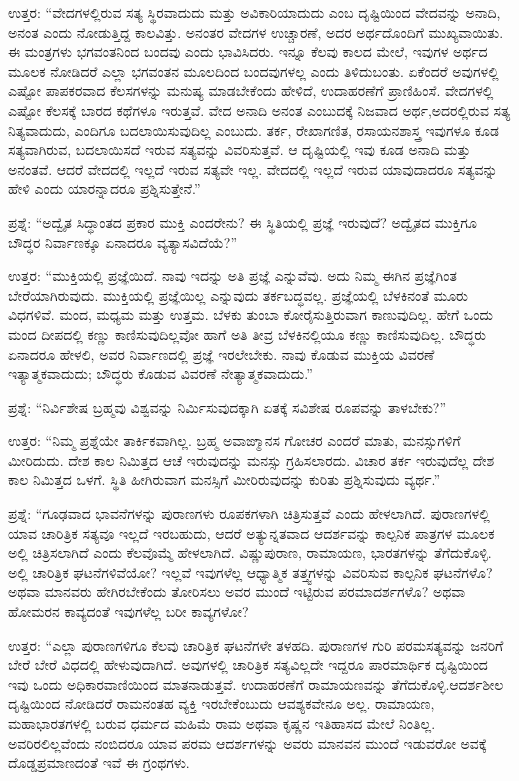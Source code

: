 ಉತ್ತರ: “ವೇದಗಳಲ್ಲಿರುವ ಸತ್ಯ ಸ್ಥಿರವಾದುದು ಮತ್ತು ಅವಿಕಾರಿಯಾದುದು ಎಂಬ ದೃಷ್ಟಿಯಿಂದ ವೇದವನ್ನು ಅನಾದಿ, ಅನಂತ ಎಂದು ನೋಡುತ್ತಿದ್ದ ಕಾಲವಿತ್ತು. ಅನಂತರ ವೇದಗಳ ಉಚ್ಚಾರಣೆ, ಅದರ ಅರ್ಥದೊಂದಿಗೆ ಮುಖ್ಯವಾಯಿತು. ಈ ಮಂತ್ರಗಳು ಭಗವಂತನಿಂದ ಬಂದವು ಎಂದು ಭಾವಿಸಿದರು. ಇನ್ನೂ ಕೆಲವು ಕಾಲದ ಮೇಲೆ, ಇವುಗಳ ಅರ್ಥದ ಮೂಲಕ ನೋಡಿದರೆ ಎಲ್ಲಾ ಭಗವಂತನ ಮೂಲದಿಂದ ಬಂದವುಗಳಲ್ಲ ಎಂದು ತಿಳಿದುಬಂತು. ಏಕೆಂದರೆ ಅವುಗಳಲ್ಲಿ ಎಷ್ಟೋ ಪಾಪಕರವಾದ ಕೆಲಸಗಳನ್ನು ಮನುಷ್ಯ ಮಾಡಬೇಕೆಂದು ಹೇಳಿದೆ, ಉದಾಹರಣೆಗೆ ಪ್ರಾಣಿಹಿಂಸೆ. ವೇದಗಳಲ್ಲಿ ಎಷ್ಟೋ ಕೆಲಸಕ್ಕೆ ಬಾರದ ಕಥೆಗಳೂ ಇರುತ್ತವೆ. ವೇದ ಅನಾದಿ ಅನಂತ ಎಂಬುದಕ್ಕೆ ನಿಜವಾದ ಅರ್ಥ,\break ಅದರಲ್ಲಿರುವ ಸತ್ಯ ನಿತ್ಯವಾದುದು, ಎಂದಿಗೂ ಬದಲಾಯಿಸುವುದಿಲ್ಲ ಎಂಬುದು. ತರ್ಕ, ರೇಖಾಗಣಿತ, ರಸಾಯನಶಾಸ್ತ್ರ ಇವುಗಳೂ ಕೂಡ ಸತ್ಯವಾಗಿರುವ, ಬದಲಾಯಿಸದೆ ಇರುವ ಸತ್ಯವನ್ನು ವಿವರಿಸುತ್ತವೆ. ಆ ದೃಷ್ಟಿಯಲ್ಲಿ ಇವು ಕೂಡ ಅನಾದಿ ಮತ್ತು ಅನಂತವೆ. ಆದರೆ ವೇದದಲ್ಲಿ ಇಲ್ಲದೆ ಇರುವ ಸತ್ಯವೇ ಇಲ್ಲ. ವೇದದಲ್ಲಿ ಇಲ್ಲದೆ ಇರುವ ಯಾವುದಾದರೂ ಸತ್ಯವನ್ನು ಹೇಳಿ ಎಂದು ಯಾರನ್ನಾದರೂ ಪ್ರಶ್ನಿಸುತ್ತೇನೆ.”

ಪ್ರಶ್ನೆ: “ಅದ್ವೈತ ಸಿದ್ಧಾಂತದ ಪ್ರಕಾರ ಮುಕ್ತಿ ಎಂದರೇನು? ಈ ಸ್ಥಿತಿಯಲ್ಲಿ ಪ್ರಜ್ಞೆ ಇರುವುದೆ? ಅದ್ವೈತದ ಮುಕ್ತಿಗೂ ಬೌದ್ಧರ ನಿರ್ವಾಣಕ್ಕೂ ಏನಾದರೂ ವ್ಯತ್ಯಾಸವಿದೆಯೆ?”

ಉತ್ತರ: “ಮುಕ್ತಿಯಲ್ಲಿ ಪ್ರಜ್ಞೆಯಿದೆ. ನಾವು ಇದನ್ನು ಅತಿ ಪ್ರಜ್ಞೆ ಎನ್ನುವೆವು. ಅದು ನಿಮ್ಮ ಈಗಿನ ಪ್ರಜ್ಞೆಗಿಂತ ಬೇರೆಯಾಗಿರುವುದು. ಮುಕ್ತಿಯಲ್ಲಿ ಪ್ರಜ್ಞೆಯಿಲ್ಲ ಎನ್ನುವುದು ತರ್ಕಬದ್ಧವಲ್ಲ. ಪ್ರಜ್ಞೆಯಲ್ಲಿ ಬೆಳಕಿನಂತೆ ಮೂರು ವಿಧಗಳಿವೆ. ಮಂದ, ಮಧ್ಯಮ ಮತ್ತು ಉತ್ತಮ. ಬೆಳಕು ತುಂಬಾ ಕೋರೈಸುತ್ತಿರುವಾಗ ಕಾಣುವುದಿಲ್ಲ. ಹೇಗೆ ಒಂದು ಮಂದ ದೀಪದಲ್ಲಿ ಕಣ್ಣು ಕಾಣಿಸುವುದಿಲ್ಲವೋ ಹಾಗೆ ಅತಿ ತೀವ್ರ ಬೆಳಕಿನಲ್ಲಿಯೂ ಕಣ್ಣು ಕಾಣಿಸುವುದಿಲ್ಲ. ಬೌದ್ಧರು ಏನಾದರೂ ಹೇಳಲಿ, ಅವರ ನಿರ್ವಾಣದಲ್ಲಿ ಪ್ರಜ್ಞೆ ಇರಲೇಬೇಕು. ನಾವು ಕೊಡುವ ಮುಕ್ತಿಯ ವಿವರಣೆ ಇತ್ಯಾತ್ಮಕವಾದುದು; ಬೌದ್ಧರು ಕೊಡುವ ವಿವರಣೆ ನೇತ್ಯಾತ್ಮಕವಾದುದು.”

ಪ್ರಶ್ನೆ: “ನಿರ್ವಿಶೇಷ ಬ್ರಹ್ಮವು ವಿಶ್ವವನ್ನು ನಿರ್ಮಿಸುವುದಕ್ಕಾಗಿ ಏತಕ್ಕೆ ಸವಿಶೇಷ ರೂಪವನ್ನು ತಾಳಬೇಕು?”

ಉತ್ತರ: “ನಿಮ್ಮ ಪ್ರಶ್ನೆಯೇ ತಾರ್ಕಿಕವಾಗಿಲ್ಲ. ಬ್ರಹ್ಮ ಅವಾಙ್ಮಾನಸ ಗೋಚರ ಎಂದರೆ ಮಾತು, ಮನಸ್ಸುಗಳಿಗೆ ಮೀರಿದುದು. ದೇಶ ಕಾಲ ನಿಮಿತ್ತದ ಆಚೆ ಇರುವುದನ್ನು ಮನಸ್ಸು ಗ್ರಹಿಸಲಾರದು. ವಿಚಾರ ತರ್ಕ ಇರುವುದೆಲ್ಲ ದೇಶ ಕಾಲ ನಿಮಿತ್ತದ ಒಳಗೆ. ಸ್ಥಿತಿ ಹೀಗಿರುವಾಗ ಮನಸ್ಸಿಗೆ ಮೀರಿರುವುದನ್ನು ಕುರಿತು ಪ್ರಶ್ನಿಸುವುದು ವ್ಯರ್ಥ.”

ಪ್ರಶ್ನೆ: “ಗೂಢವಾದ ಭಾವನೆಗಳನ್ನು ಪುರಾಣಗಳು ರೂಪಕಗಳಾಗಿ ಚಿತ್ರಿಸುತ್ತವೆ ಎಂದು ಹೇಳಲಾಗಿದೆ. ಪುರಾಣಗಳಲ್ಲಿ ಯಾವ ಚಾರಿತ್ರಿಕ ಸತ್ಯವೂ ಇಲ್ಲದೆ ಇರಬಹುದು, ಆದರೆ ಅತ್ಯುನ್ನತವಾದ ಆದರ್ಶವನ್ನು ಕಾಲ್ಪನಿಕ ಪಾತ್ರಗಳ ಮೂಲಕ ಅಲ್ಲಿ ಚಿತ್ರಿಸಲಾಗಿದೆ ಎಂದು ಕೆಲವೊಮ್ಮೆ ಹೇಳಲಾಗಿದೆ. ವಿಷ್ಣುಪುರಾಣ, ರಾಮಾಯಣ, ಭಾರತಗಳನ್ನು ತೆಗೆದುಕೊಳ್ಳಿ. ಅಲ್ಲಿ ಚಾರಿತ್ರಿಕ ಘಟನೆಗಳಿವೆಯೋ? ಇಲ್ಲವೆ ಇವುಗಳೆಲ್ಲ ಆಧ್ಯಾತ್ಮಿಕ ತತ್ತ್ವಗಳನ್ನು ವಿವರಿಸುವ ಕಾಲ್ಪನಿಕ ಘಟನೆಗಳೊ? ಅಥವಾ ಮಾನವರು ಹೇಗಿರಬೇಕೆಂದು ತೋರಿಸಲು ಅವರ ಮುಂದೆ ಇಟ್ಟಿರುವ ಪರಮಾದರ್ಶಗಳೊ? ಅಥವಾ ಹೋಮರನ ಕಾವ್ಯದಂತೆ ಇವುಗಳೆಲ್ಲ ಬರೀ ಕಾವ್ಯಗಳೋ?

ಉತ್ತರ: “ಎಲ್ಲಾ ಪುರಾಣಗಳಿಗೂ ಕೆಲವು ಚಾರಿತ್ರಿಕ ಘಟನೆಗಳೇ ತಳಹದಿ. ಪುರಾಣಗಳ ಗುರಿ ಪರಮಸತ್ಯವನ್ನು ಜನರಿಗೆ ಬೇರೆ ಬೇರೆ ವಿಧದಲ್ಲಿ ಹೇಳುವುದಾಗಿದೆ. ಅವುಗಳಲ್ಲಿ ಚಾರಿತ್ರಿಕ ಸತ್ಯವಿಲ್ಲದೇ ಇದ್ದರೂ ಪಾರಮಾರ್ಥಿಕ ದೃಷ್ಟಿಯಿಂದ ಇವು ಒಂದು ಅಧಿಕಾರ\-ವಾಣಿಯಿಂದ ಮಾತನಾಡುತ್ತವೆ. ಉದಾಹರಣೆಗೆ ರಾಮಾಯಣವನ್ನು ತೆಗೆದುಕೊಳ್ಳಿ.\break ಆದರ್ಶಶೀಲ ದೃಷ್ಟಿಯಿಂದ ನೋಡಿದರೆ ರಾಮನಂತಹ ವ್ಯಕ್ತಿ ಇರಬೇಕೆಂಬುದು ಆವಶ್ಯಕವೇನೂ ಅಲ್ಲ. ರಾಮಾಯಣ, ಮಹಾಭಾರತಗಳಲ್ಲಿ ಬರುವ ಧರ್ಮದ ಮಹಿಮೆ ರಾಮ ಅಥವಾ ಕೃಷ್ಣನ ಇತಿಹಾಸದ ಮೇಲೆ ನಿಂತಿಲ್ಲ. ಅವರಿರಲಿಲ್ಲವೆಂದು ನಂಬಿದರೂ ಯಾವ ಪರಮ ಆದರ್ಶಗಳನ್ನು ಅವರು ಮಾನವನ ಮುಂದೆ ಇಡುವರೋ ಅವಕ್ಕೆ ದೊಡ್ಡ\break ಪ್ರಮಾಣದಂತೆ ಇವೆ ಈ ಗ್ರಂಥಗಳು.

